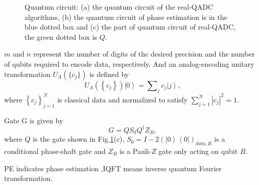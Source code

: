\documentclass[%
 reprint,
 amsmath,amssymb,
pra,
]{revtex4-1}
\begin{document}
\begin{figure}[htbp]
 \caption{Quantum circuit: (a) the quantum circuit of the real-QADC algorithms, 
 (b) the quantum circuit of phase estimation is in the blue dotted box
 and (c) the part of quantum circuit of real-QADC, the green dotted box is $Q$.}
 \label{QADC_fig}
\end{figure}

$m$ and $n$ represent the number of digits of the desired precision and the number of qubits required to encode data, respectively.
And an analog-encoding unitary transformation $U_A(\{c_j\})$ is defined by
\begin{equation}
U_A\left( {\left\{ {{c_j}} \right\}} \right)\left| 0 \right\rangle  = \sum\nolimits_j {{c_j}\left| j \right\rangle },
\end{equation}
where $\left\{ {{c_j}} \right\}_{j = 1}^N$ is classical data and normalized to satisfy $\sum\nolimits_{j = 1}^N {{{\left| {{c_j}} \right|}^2}}  = 1$.

Gate G is given by
\begin{equation}
G = Q{S_0}{Q^\dag }{Z_B},
\end{equation}
where $Q$ is the gate shown in Fig.\ref{QADC_fig}(c), ${S_0} = I - 2{\left( {\left| 0 \right\rangle \left\langle 0 \right|} \right)_{data,B}}$
is a conditional phase-shaft gate and ${Z_B}$ is a Pauli-$Z$ gate only acting on qubit $B$.

PE indicates phase estimation ,IQFT means inverse quantum Fourier transformation\cite{nielsen_quantum_2002}.
\end{document}
